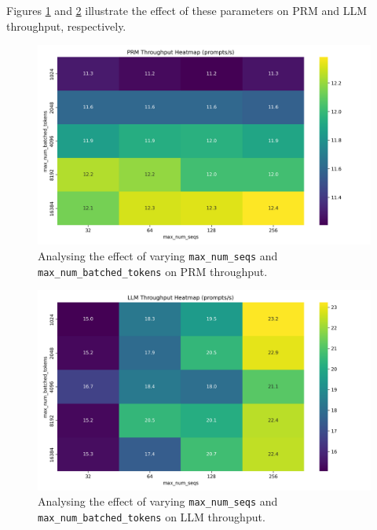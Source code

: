 \documentclass[11pt,twoside]{report}
\begin{document}
Figures \ref{fig:prm_batch_size_tradeoff} and \ref{fig:llm_batch_size_tradeoff} illustrate the effect of these parameters on PRM and LLM throughput, respectively. 



\begin{figure}[htbp]
  \centering
  \includegraphics[width=\textwidth]{figures/prm_batch_size_tradeoff.png}
  \caption{Analysing the effect of varying \texttt{max\_num\_seqs} and \texttt{max\_num\_batched\_tokens} on PRM throughput.}
  \label{fig:prm_batch_size_tradeoff}
\end{figure}

\begin{figure}[htbp]
  \centering
  \includegraphics[width=\textwidth]{figures/llm_batch_size_tradeoff.png}
  \caption{Analysing the effect of varying \texttt{max\_num\_seqs} and \texttt{max\_num\_batched\_tokens} on LLM throughput.}
  \label{fig:llm_batch_size_tradeoff}
\end{figure}
\end{document}
